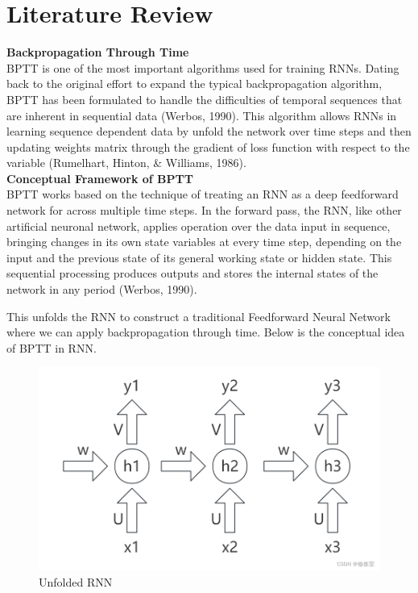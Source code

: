 \documentclass[12pt,a4paper]{article}
\begin{document}
\section{Literature Review}
\textbf{Backpropagation Through Time}
\\[1ex]
BPTT is one of the most important algorithms used for training RNNs. Dating back to the original effort to expand the typical backpropagation algorithm, BPTT has been formulated to handle the difficulties of temporal sequences that are inherent in sequential data (Werbos, 1990). This algorithm allows RNNs in learning sequence dependent data by unfold the network over time steps and then updating weights matrix through the gradient of loss function with respect to the variable (Rumelhart, Hinton, \& Williams, 1986).
\\[2ex]
\textbf{Conceptual Framework of BPTT}
\\[1ex]
BPTT works based on the technique of treating an RNN as a deep feedforward network for across multiple time steps. In the forward pass, the RNN, like other artificial neuronal network, applies operation over the data input in sequence, bringing changes in its own state variables at every time step, depending on the input and the previous state of its general working state or hidden state. This sequential processing produces outputs and stores the internal states of the network in any period (Werbos, 1990).

This unfolds the RNN to construct a traditional Feedforward Neural Network where we can apply backpropagation through time. Below is the conceptual idea of BPTT in RNN.
\begin{figure}[h!]
    \centering
    \includegraphics[width=1\textwidth]{../Pic/pic1.png} %
    \caption{Unfolded RNN}
\end{figure}
\end{document}

